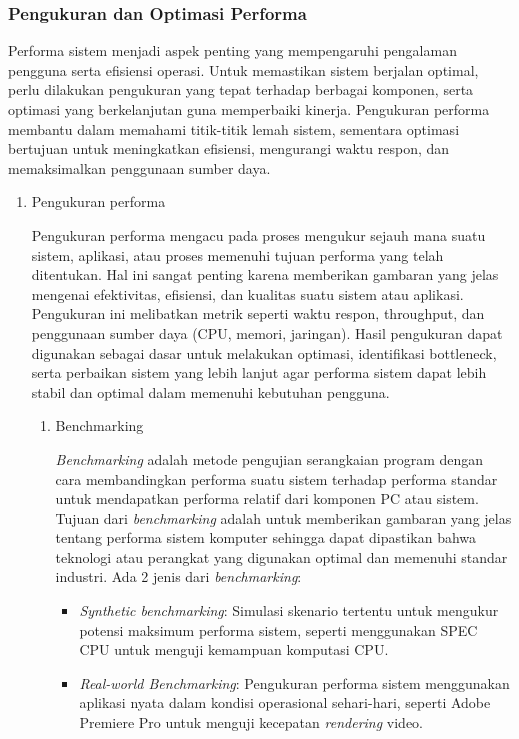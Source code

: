 \documentclass[12pt]{article}
\begin{document}
\subsubsection{Pengukuran dan Optimasi Performa}
\par Performa sistem menjadi aspek penting yang mempengaruhi pengalaman pengguna serta efisiensi operasi. Untuk memastikan sistem berjalan optimal, perlu dilakukan pengukuran yang tepat terhadap berbagai komponen, serta optimasi yang berkelanjutan guna memperbaiki kinerja. Pengukuran performa membantu dalam memahami titik-titik lemah sistem, sementara optimasi bertujuan untuk meningkatkan efisiensi, mengurangi waktu respon, dan memaksimalkan penggunaan sumber daya.
\begin{enumerate}
    \item {Pengukuran performa}
    \par Pengukuran performa mengacu pada proses mengukur sejauh mana suatu sistem, aplikasi, atau proses memenuhi tujuan performa yang telah ditentukan. Hal ini sangat penting karena memberikan gambaran yang jelas mengenai efektivitas, efisiensi, dan kualitas suatu sistem atau aplikasi. Pengukuran ini melibatkan metrik seperti waktu respon, throughput, dan penggunaan sumber daya (CPU, memori, jaringan). Hasil pengukuran dapat digunakan sebagai dasar untuk melakukan optimasi, identifikasi bottleneck, serta perbaikan sistem yang lebih lanjut agar performa sistem dapat lebih stabil dan optimal dalam memenuhi kebutuhan pengguna.
    \begin{enumerate}
        \item Benchmarking
        \par \textit{Benchmarking} adalah metode pengujian serangkaian program dengan cara membandingkan performa suatu sistem terhadap performa standar untuk mendapatkan performa relatif dari komponen PC atau sistem. Tujuan dari \textit{benchmarking} adalah untuk memberikan gambaran yang jelas tentang performa sistem komputer sehingga dapat dipastikan bahwa teknologi atau perangkat yang digunakan optimal dan memenuhi standar industri. Ada 2 jenis dari \textit{benchmarking}:
        \begin{itemize}
        \item \textit{Synthetic benchmarking}: Simulasi skenario tertentu untuk mengukur potensi maksimum performa sistem, seperti menggunakan SPEC CPU untuk menguji kemampuan komputasi CPU.
        \item \textit{Real-world Benchmarking}: Pengukuran performa sistem menggunakan aplikasi nyata dalam kondisi operasional sehari-hari, seperti Adobe Premiere Pro untuk menguji kecepatan \textit{rendering} video.

\end{itemize}
\end{enumerate}
\end{enumerate}
\end{document}

